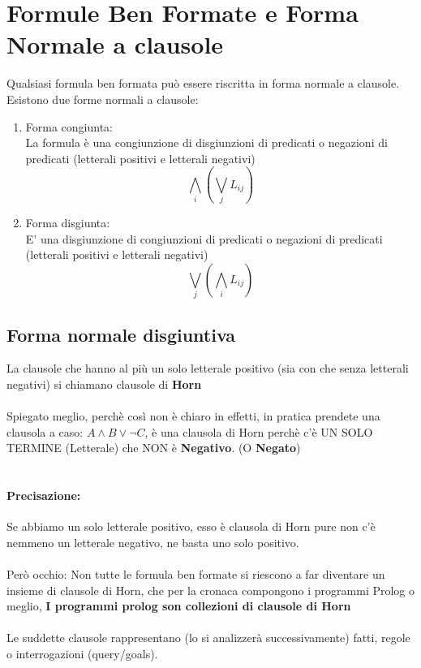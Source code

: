 \documentclass[12pt, a4paper, openany, oneside]{book}
\begin{document}
\section{Formule Ben Formate e Forma Normale a clausole}
Qualsiasi formula ben formata può essere riscritta in forma normale a clausole.
Esistono due forme normali a clausole:
\begin{enumerate}
	\item Forma congiunta: \\
	La formula è una congiunzione di disgiunzioni di predicati o negazioni di 
	predicati (letterali positivi e letterali negativi) \\ 
	\[\bigwedge \limits_{i} (\bigvee \limits_{j} L_{ij})\]
	\item Forma disgiunta: \\
	E' una disgiunzione di congiunzioni di predicati o negazioni di predicati
	(letterali positivi e letterali negativi)
	\[\bigvee \limits _{j} (\bigwedge \limits _{i} L_{ij})\]
\end{enumerate}
\subsection{Forma normale disgiuntiva}
La clausole che hanno al più un solo letterale positivo (sia con che senza 
letterali negativi) si chiamano clausole di \color{red} \textbf{Horn} \color{black}
\\ \\
Spiegato meglio, perchè così non è chiaro in effetti, in pratica prendete una 
clausola a caso: $A \wedge B \vee \neg C $, è una clausola di Horn perchè c'è
UN SOLO TERMINE (Letterale) che NON è \textbf{Negativo}. (O \textbf{Negato})
\\ \\
\paragraph{Precisazione: } Se abbiamo un solo letterale positivo, esso è clausola
di Horn pure non c'è nemmeno un letterale negativo,  ne basta uno solo positivo.
\\ \\
Però occhio:
Non tutte le formula ben formate si riescono a far diventare un insieme di 
clausole di Horn, che per la cronaca compongono i programmi Prolog o meglio, 
\color{blue} \textbf{I programmi prolog son collezioni di clausole di Horn} 
\color{black}
\\ \\
Le suddette clausole rappresentano (lo si analizzerà successivamente) fatti, 
regole o interrogazioni (query/goals).
\end{document}
